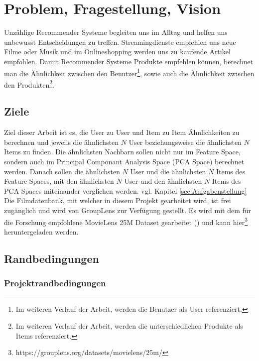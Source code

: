 \chapter{Problem, Fragestellung, Vision}
\label{ch:ProblemFragestellungVision}
Unzählige Recommender Systeme begleiten uns im Alltag und helfen uns unbewusst Entscheidungen zu treffen. Streamingdienste empfehlen uns neue Filme oder Musik und im Onlineshopping werden uns zu kaufende Artikel empfohlen. Damit Recommender Systeme Produkte empfehlen können, berechnet man die Ähnlichkeit zwischen den Benutzer\footnote{Im weiteren Verlauf der Arbeit, werden die Benutzer als User referenziert.}, sowie auch die Ähnlichkeit zwischen den Produkten\footnote{Im weiteren Verlauf der Arbeit, werden die unterschiedlichen Produkte als Items referenziert.}.\\

\section{Ziele}
\noindent Ziel dieser Arbeit ist es, die User zu User und Item zu Item Ähnlichkeiten zu berechnen und jeweils die ähnlichsten $N$ User beziehungsweise die ähnlichsten $N$ Items zu finden.
Die ähnlichsten Nachbarn sollen nicht nur im Feature Space, sondern auch im Principal Componant Analysis Space (PCA Space) berechnet werden. Danach sollen die ähnlichsten $N$ User und die ähnlichsten $N$ Items des Feature Spaces, mit den ähnlichsten $N$ User und den ähnlichsten $N$ Items des PCA Spaces miteinander verglichen werden. vgl.  Kapitel \ref{sec:Aufgabenstellung} \\

\noindent Die Filmdatenbank, mit welcher in diesem Projekt gearbeitet wird, ist frei zugänglich und wird von GroupLens zur Verfügung gestellt. Es wird mit dem für die Forschung empfohlene MovieLens 25M Dataset gearbeitet (\cite{10.1145/2827872}) und kann hier\footnote{https://grouplens.org/datasets/movielens/25m/} heruntergeladen werden.

\section{Randbedingungen}
\subsection{Projektrandbedingungen}


